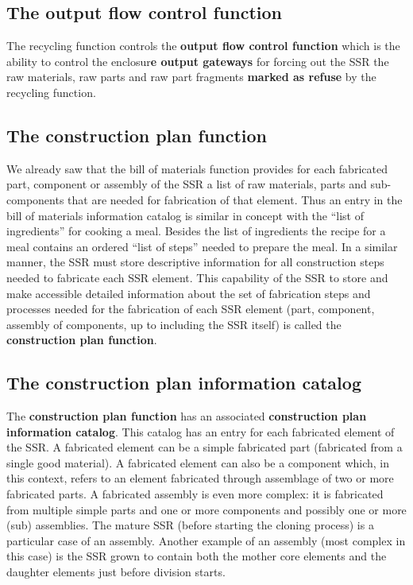 \documentclass[letterpaper]{article}
\begin{document}
\bigskip

\subsection[The output flow control function]{The output flow control
function}
\hypertarget{RefHeading3082306210128}{}The recycling function controls
the \textbf{output flow control function }which is the ability to
control the enclosur\textbf{e output gateways }for forcing out the SSR
the raw materials, raw parts and raw part fragments \textbf{marked as
refuse} by the recycling function.


\bigskip

\subsection[The construction plan function]{The construction plan
function}
\hypertarget{RefHeading3084306210128}{}We already saw that the bill of
materials function provides for each fabricated part, component or
assembly of the SSR a list of raw materials, parts and sub-components
that are needed for fabrication of that element. Thus an entry in the
bill of materials information catalog is similar in concept with the
“list of ingredients” for cooking a meal. Besides the list of
ingredients the recipe for a meal contains an ordered “list of steps”
needed to prepare the meal. In a similar manner, the SSR must store
descriptive information for all construction steps needed to fabricate
each SSR element. This capability of the SSR to store and make
accessible detailed information about the set of fabrication steps and
processes needed for the fabrication of each SSR element (part,
component, assembly of components, up to including the SSR itself) is
called the \textbf{construction plan function}.


\bigskip

\subsection[The construction plan information catalog]{The construction
plan information catalog}
\hypertarget{RefHeading3086306210128}{}The \textbf{construction plan
function} has an associated \textbf{construction plan information
catalog}. This catalog has an entry for each fabricated element of the
SSR. A fabricated element can be a simple fabricated part (fabricated
from a single good material). A fabricated element can also be a
component which, in this context, refers to an element fabricated
through assemblage of two or more fabricated parts. A fabricated
assembly is even more complex: it is fabricated from multiple simple
parts and one or more components and possibly one or more (sub)
assemblies. The mature SSR (before starting the cloning process) is a
particular case of an assembly. Another example of an assembly (most
complex in this case) is the SSR grown to contain both the mother core
elements and the daughter elements just before division starts. 
\end{document}
